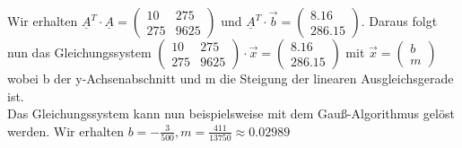     \newline %
    \newline
    Wir erhalten $\underline{A}^T \cdot \underline{A} = \begin{pmatrix}
      10 & 275\\ 
      275 & 9625
    \end{pmatrix}$ 
    und $\underline{A}^T \cdot \vec{b} =  \begin{pmatrix}
      8.16\\ 
      286.15
    \end{pmatrix}$.
    \vspace{4pt}
    \newline
    \noindent Daraus folgt nun das Gleichungssystem 
    $\begin{pmatrix}
      10 & 275\\ 
      275 & 9625
    \end{pmatrix}
    \cdot \vec{x}
    = \begin{pmatrix}
      8.16\\ 
      286.15
    \end{pmatrix}$
    mit $\vec{x} = \begin{pmatrix}
      b\\ 
      m
    \end{pmatrix}$
    \vspace{4pt}
    \newline
    wobei b der y-Achsenabschnitt und m die Steigung der linearen Ausgleichsgerade ist.\\
    \noindent Das Gleichungssystem kann nun beispielsweise mit dem Gauß-Algorithmus gelöst werden. Wir erhalten $b = -\frac{3}{500}, m = \frac{411}{13750} \approx 0.02989$